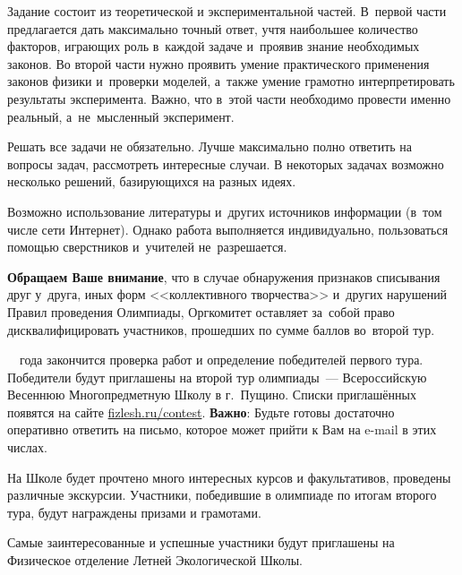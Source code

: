 \documentclass[a4paper,12pt]{article}
\begin{document}
Задание состоит из теоретической и экспериментальной частей. В~первой части предлагается
дать максимально точный ответ, учтя наибольшее количество факторов, играющих роль в~каждой
задаче и~проявив знание необходимых законов. Во второй части нужно проявить умение практического
применения законов физики и~проверки моделей, а~также умение грамотно интерпретировать результаты
эксперимента. Важно, что в~этой части необходимо провести именно реальный, а~не~мысленный эксперимент.

\bigskip

Решать все задачи не обязательно. Лучше максимально полно ответить на вопросы задач,
рассмотреть интересные случаи. В некоторых задачах возможно несколько решений, базирующихся
на разных идеях.

\bigskip

Возможно использование литературы и~других источников информации (в~том числе сети Интернет).
Однако работа выполняется индивидуально, пользоваться помощью сверстников и~учителей не~разрешается.

\textbf{Обращаем Ваше внимание}, что в случае обнаружения признаков списывания друг у~друга,
иных форм <<коллективного творчества>> и~других нарушений Правил проведения Олимпиады,
Оргкомитет оставляет за~собой право дисквалифицировать участников, прошедших по сумме баллов
во~второй тур.

\bigskip



\bigskip

\olympcheckend~\olympyearend~года закончится проверка работ и определение победителей первого тура.
Победители будут приглашены на второй тур олимпиады~--- Всероссийскую Весеннюю Многопредметную Школу
в г.~Пущино. Списки приглашённых появятся на сайте
\href{http://fizlesh.ru/contest}{fizlesh.ru/contest}.
\textbf{Важно}: Будьте готовы достаточно оперативно ответить на письмо, которое может
прийти к Вам на e-mail в этих числах.

На Школе будет прочтено много интересных курсов и факультативов, проведены различные экскурсии.
Участники, победившие в олимпиаде по итогам второго тура, будут награждены призами и грамотами.

Самые заинтересованные и успешные участники будут приглашены
на Физическое отделение Летней Экологической Школы.
\end{document}
